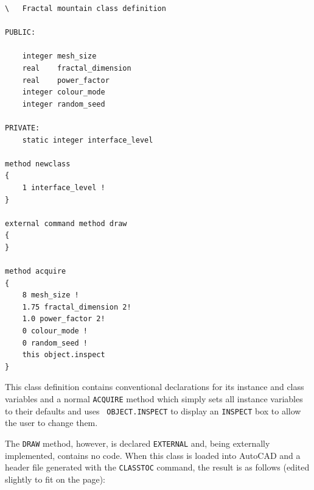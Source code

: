 \documentclass{article}
\begin{document}
{\small
\begin{verbatim}
\   Fractal mountain class definition

PUBLIC:

    integer mesh_size
    real    fractal_dimension
    real    power_factor
    integer colour_mode
    integer random_seed

PRIVATE:
    static integer interface_level

method newclass
{
    1 interface_level !
}

external command method draw
{
}

method acquire
{
    8 mesh_size !
    1.75 fractal_dimension 2!
    1.0 power_factor 2!
    0 colour_mode !
    0 random_seed !
    this object.inspect
}
\end{verbatim}
}

This class definition contains conventional declarations for its
instance and class variables and a normal {\tt ACQUIRE} method which
simply sets all instance variables to their defaults and uses {\tt
OBJECT.INSPECT} to display an {\tt INSPECT} box to allow the user to
change them.

The {\tt DRAW} method, however, is declared {\tt EXTERNAL} and, being
externally implemented, contains no code.  When this class is loaded
into AutoCAD and a header file generated with the {\tt CLASSTOC}
command, the result is as follows (edited slightly to fit on the
page):
\end{document}
